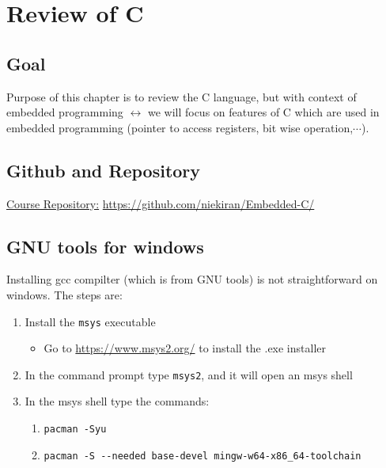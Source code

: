 


\chapter{Review of C}


\section{Goal}

Purpose of this chapter is to review the C language, but with context of embedded programming $\leftrightarrow$ we will focus on features of C which are used in embedded programming (pointer to access registers, bit wise operation,$\cdots$).

\section{Github and Repository}

\underline{Course Repository:} \url{https://github.com/niekiran/Embedded-C/}


\section{GNU tools for windows}

Installing gcc compilter (which is from GNU tools) is not straightforward on windows. The steps are:

\begin{enumerate}
    \item Install the \verb|msys| executable 
    
    \begin{itemize}
        \item Go to \url{https://www.msys2.org/} to install the .exe installer
    \end{itemize}
    
    \item In the command prompt type \verb|msys2|, and it will open an msys shell
    
    \item In the msys shell type the commands:
    
    \begin{enumerate}
        \item \verb|pacman -Syu|
        
        \item \verb|pacman -S --needed base-devel mingw-w64-x86_64-toolchain|
    \end{enumerate}
    
\end{enumerate}


